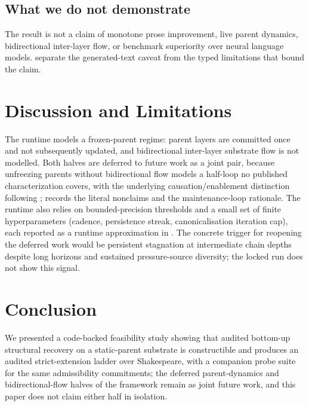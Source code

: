 \documentclass{article}
\theoremstyle{definition}
\begin{document}
\subsection{What we do not demonstrate}\label{subsec:do-not-demonstrate}

The result is not a claim of monotone prose improvement, live parent dynamics, bidirectional inter-layer flow, or benchmark superiority over neural language models.  separate the generated-text caveat from the typed limitations that bound the claim.
 \section{Discussion and Limitations}\label{sec:discussion}\label{subsec:joint-deferral}\label{subsec:approximations}\label{subsec:static-parent}

The runtime models a frozen-parent regime: parent layers are committed once and not subsequently updated, and bidirectional inter-layer substrate flow is not modelled. Both halves are deferred to future work as a joint pair, because unfreezing parents without bidirectional flow models a half-loop no published characterization covers, with the underlying causation/enablement distinction following \cite{Tsiokos2026NotchAStone,Pearl2000Causality};  records the literal nonclaims and the maintenance-loop rationale. The runtime also relies on bounded-precision thresholds and a small set of finite hyperparameters (cadence, persistence streak, canonicalisation iteration cap), each reported as a runtime approximation in . The concrete trigger for reopening the deferred work would be persistent stagnation at intermediate chain depths despite long horizons and sustained pressure-source diversity; the locked run does not show this signal.
 \section{Conclusion}\label{sec:conclusion}

We presented a code-backed feasibility study showing that audited bottom-up structural recovery on a static-parent substrate is constructible and produces an audited strict-extension ladder over Shakespeare, with a companion probe suite for the same admissibility commitments; the deferred parent-dynamics and bidirectional-flow halves of the framework remain as joint future work, and this paper does not claim either half in isolation.
 
\end{document}
